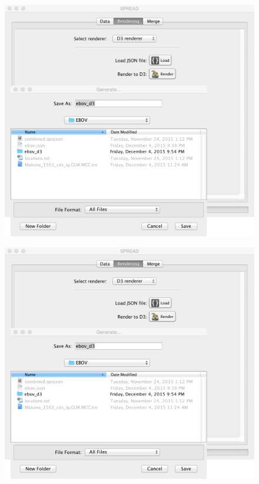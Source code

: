 \documentclass[english]{paper}
\begin{document}
\begin{figure}[!H]
\centering
\includegraphics[width=1\textwidth]{./figures/fig2_render_d3.pdf} %
\label{fig:renderD3}
\end{figure}

\begin{figure}[!H]
\centering
\includegraphics[width=1\textwidth]{./figures/fig2_render_d3.pdf} %
\label{fig:renderD3}
\end{figure}
\end{document}
